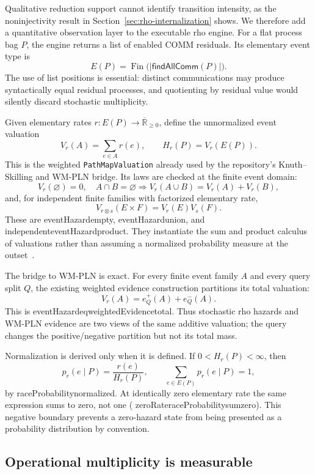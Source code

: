 \documentclass[11pt]{article}
\newcommand{\Fin}{\operatorname{Fin}}
\newcommand{\code}[1]{\texttt{#1}}
\newcommand{\leanname}[1]{{\scriptsize\ttfamily
  \def\_{\textunderscore\allowbreak}#1}}
\begin{document}
Qualitative reduction support cannot identify transition intensity, as the
noninjectivity result in Section~\ref{sec:rho-internalization} shows.  We
therefore add a quantitative observation layer to the executable rho engine.
For a flat process bag \(P\), the engine returns a list of enabled COMM
residuals.  Its elementary event type is
\[
  E(P)=\Fin\bigl(|\mathsf{findAllComm}(P)|\bigr).
\]
The use of list positions is essential: distinct communications may produce
syntactically equal residual processes, and quotienting by residual value
would silently discard stochastic multiplicity.

Given elementary rates \(r:E(P)\to\overline{\mathbb R}_{\ge 0}\), define the
unnormalized event valuation
\[
  V_r(A)=\sum_{e\in A}r(e), \qquad H_r(P)=V_r(E(P)).
\]
This is the weighted \code{PathMapValuation} already used by the repository's
Knuth--Skilling and WM-PLN bridge.  Its laws are checked at the finite event
domain:
\[
  V_r(\varnothing)=0,
  \quad A\cap B=\varnothing\Rightarrow
       V_r(A\cup B)=V_r(A)+V_r(B),
\]
and, for independent finite families with factorized elementary rate,
\[
 V_{r\otimes s}(E\times F)=V_r(E)V_s(F).
\]
These are \leanname{eventHazard\_empty},
\leanname{eventHazard\_union}, and
\leanname{independent\_eventHazard\_product}.  They instantiate the sum and
product calculus of valuations rather than assuming a normalized probability
measure at the outset~\cite{knuthSkilling2012}.

The bridge to WM-PLN is exact.  For every finite event family \(A\) and every
query split \(Q\), the existing weighted evidence construction partitions its
total valuation:
\[
  V_r(A)=e^+_Q(A)+e^-_Q(A).
\]
This is \leanname{eventHazard\_eq\_weightedEvidence\_total}.  Thus stochastic
rho hazards and WM-PLN evidence are two views of the same additive valuation;
the query changes the positive/negative partition but not its total mass.

Normalization is derived only when it is defined.  If
\(0<H_r(P)<\infty\), then
\[
  p_r(e\mid P)=\frac{r(e)}{H_r(P)},
  \qquad \sum_{e\in E(P)}p_r(e\mid P)=1,
\]
by \leanname{raceProbability\_normalized}.  At identically zero elementary
rate the same expression sums to zero, not one
(\leanname{zeroRate\_raceProbability\_sum\_zero}).  This negative boundary
prevents a zero-hazard state from being presented as a probability
distribution by convention.

\subsection{Operational multiplicity is measurable}
\end{document}

